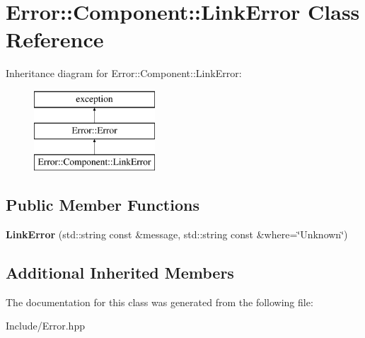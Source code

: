 \hypertarget{classError_1_1Component_1_1LinkError}{}\section{Error\+:\+:Component\+:\+:Link\+Error Class Reference}
\label{classError_1_1Component_1_1LinkError}
Inheritance diagram for Error\+:\+:Component\+:\+:Link\+Error\+:\begin{figure}[H]
\begin{center}
\leavevmode
\includegraphics[height=3.000000cm]{classError_1_1Component_1_1LinkError}
\end{center}
\end{figure}
\subsection*{Public Member Functions}
\begin{DoxyCompactItemize}
\item 
\mbox{\label{classError_1_1Component_1_1LinkError_a99177f7cad093b2351f057ce2c64b45b}} 
{\bfseries Link\+Error} (std\+::string const \&message, std\+::string const \&where=\char`\"{}Unknown\char`\"{})
\end{DoxyCompactItemize}
\subsection*{Additional Inherited Members}


The documentation for this class was generated from the following file\+:\begin{DoxyCompactItemize}
\item 
Include/Error.\+hpp\end{DoxyCompactItemize}
